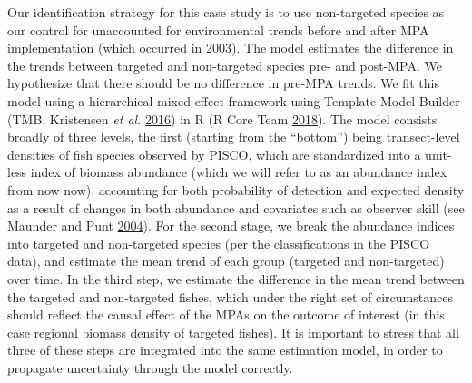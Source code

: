 \documentclass[twoside,12pt,final]{ucthesis-CA2012}
\begin{document}
\begin{ucmainmatter}
Our identification strategy for this case study is to use non-targeted
species as our control for unaccounted for environmental trends before
and after MPA implementation (which occurred in 2003). The model
estimates the difference in the trends between targeted and non-targeted
species pre- and post-MPA. We hypothesize that there should be no
difference in pre-MPA trends. We fit this model using a hierarchical
mixed-effect framework using Template Model Builder (TMB, Kristensen
\emph{et al.} \protect\hyperlink{ref-Kristensen2016}{2016}) in R (R Core
Team \protect\hyperlink{ref-RCoreTeam2018}{2018}). The model consists
broadly of three levels, the first (starting from the ``bottom'') being
transect-level densities of fish species observed by PISCO, which are
standardized into a unit-less index of biomass abundance (which we will
refer to as an abundance index from now now), accounting for both
probability of detection and expected density as a result of changes in
both abundance and covariates such as observer skill (see Maunder and
Punt \protect\hyperlink{ref-Maunder2004}{2004}). For the second stage,
we break the abundance indices into targeted and non-targeted species
(per the classifications in the PISCO data), and estimate the mean trend
of each group (targeted and non-targeted) over time. In the third step,
we estimate the difference in the mean trend between the targeted and
non-targeted fishes, which under the right set of circumstances should
reflect the causal effect of the MPAs on the outcome of interest (in
this case regional biomass density of targeted fishes). It is important
to stress that all three of these steps are integrated into the same
estimation model, in order to propagate uncertainty through the model
correctly.


\end{ucmainmatter}
\end{document}
